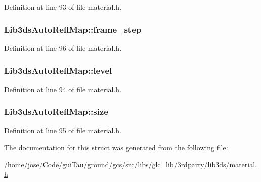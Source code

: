 Definition at line 93 of file material.\-h.

\hypertarget{struct_lib3ds_auto_refl_map_a30446ee5fc22a8b5f0b958026b2c66c9}{
\subsubsection[{frame\-\_\-step}]{ Lib3ds\-Auto\-Refl\-Map\-::frame\-\_\-step}}\label{struct_lib3ds_auto_refl_map_a30446ee5fc22a8b5f0b958026b2c66c9}


Definition at line 96 of file material.\-h.

\hypertarget{struct_lib3ds_auto_refl_map_ac4a9724ab4078b5e189cfb8f776ff821}{
\subsubsection[{level}]{ Lib3ds\-Auto\-Refl\-Map\-::level}}\label{struct_lib3ds_auto_refl_map_ac4a9724ab4078b5e189cfb8f776ff821}


Definition at line 94 of file material.\-h.

\hypertarget{struct_lib3ds_auto_refl_map_a8e9b42171de7234d7dff6b0f3be98851}{
\subsubsection[{size}]{ Lib3ds\-Auto\-Refl\-Map\-::size}}\label{struct_lib3ds_auto_refl_map_a8e9b42171de7234d7dff6b0f3be98851}


Definition at line 95 of file material.\-h.



The documentation for this struct was generated from the following file\-:\begin{DoxyCompactItemize}
\item 
/home/jose/\-Code/gui\-Tau/ground/gcs/src/libs/glc\-\_\-lib/3rdparty/lib3ds/\hyperlink{material_8h}{material.\-h}\end{DoxyCompactItemize}
